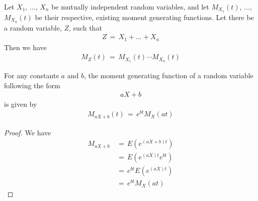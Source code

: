 \begin{theorem}
    \label{mgf_sum_multiple_random_variables}        
    Let $X_{1}$, $\dots$, $X_{n}$ be mutually independent random variables, and let $M_{X_{1}}(t)$, $\dots$, $M_{X_{n}}(t)$ be their respective, existing moment generating functions. Let there be a random variable, $Z$, such that
    \begin{align*}
        Z \hspace{2pt} = \hspace{2pt} X_{1} + \dots + X_{n}
    \end{align*}
    Then we have
    \begin{align*}
        M_{Z}(t) \hspace{2pt} = \hspace{2pt} M_{X_{1}}(t) \cdots M_{X_{n}}(t)
    \end{align*}
\end{theorem}

\begin{theorem}
    \label{mgf_single_random_variable_in_linear_form}
    For any constants $a$ and $b$, the moment generating function of a random variable following the form
    \begin{align*}
        aX + b
    \end{align*}
    is given by
    \begin{align*}
        M_{aX + b}(t) \hspace{2pt} = \hspace{2pt} e^{bt} M_{X}(at)
    \end{align*}
    \begin{proof}
        We have
        \begin{align*}
            M_{aX + b} \hspace{2pt} &= \hspace{2pt} E(e^{(aX + b)t}) \\[1ex]
            &= \hspace{2pt} E(e^{(aX)t} e^{bt}) \\[1ex]
            &= \hspace{2pt} e^{bt} E(e^{(aX)t}) \\[1ex]
            &= \hspace{2pt} e^{bt} M_{X}(at)
        \end{align*}
    \end{proof}
\end{theorem}